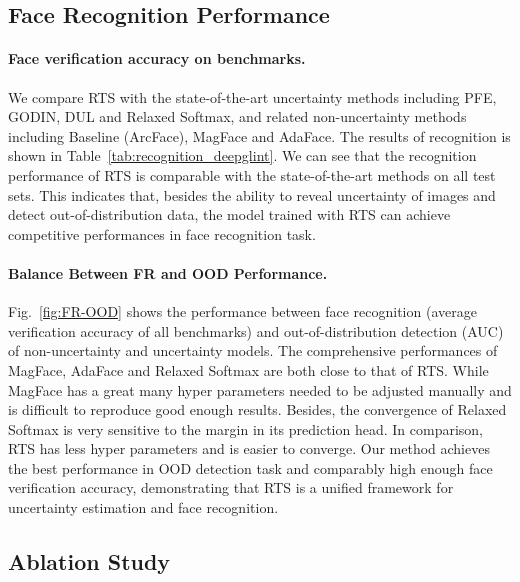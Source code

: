 \documentclass[letterpaper]{article} %
\begin{document}
\vspace{-1.43mm}
\subsection{Face Recognition Performance}
\label{ssec:face recognition}
\paragraph{Face verification accuracy on benchmarks.} We compare RTS with the state-of-the-art uncertainty methods including PFE, GODIN, DUL and Relaxed Softmax, and related non-uncertainty methods including Baseline (ArcFace), MagFace and AdaFace.
The results of recognition is shown in Table~\ref{tab:recognition_deepglint}. We can see that the recognition performance of RTS is comparable with the state-of-the-art methods on all test sets. This indicates that, besides the ability to reveal uncertainty of images and detect out-of-distribution data, the model trained with RTS can achieve competitive performances in face recognition task.

\paragraph{Balance Between FR and OOD Performance. } Fig.~\ref{fig:FR-OOD} shows the performance between face recognition (average verification accuracy of all benchmarks) and out-of-distribution detection (AUC) of non-uncertainty and uncertainty models. The comprehensive performances of MagFace, AdaFace and Relaxed Softmax are both close to that of RTS. While MagFace has a great many hyper parameters needed to be adjusted manually and is difficult to reproduce good enough results. Besides, the convergence of Relaxed Softmax is very sensitive to the margin in its prediction head. In comparison, RTS has less hyper parameters and is easier to converge. Our method achieves the best performance in OOD detection task and comparably high enough face verification accuracy, demonstrating that RTS is a unified framework for uncertainty estimation and face recognition.










\subsection{Ablation Study}
\label{ssec:ablation}
\end{document}
